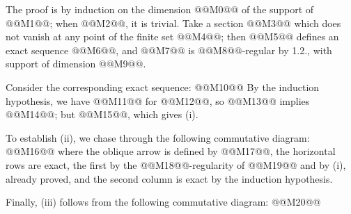 The proof is by induction on the dimension @@M0@@ of the support of @@M1@@; when @@M2@@, it is trivial. Take a section @@M3@@ which does not vanish at any point of the finite set @@M4@@; then @@M5@@ defines an exact sequence @@M6@@, and @@M7@@ is @@M8@@-regular by 1.2., with support of dimension @@M9@@.

Consider the corresponding exact sequence:
@@M10@@
By the induction hypothesis, we have @@M11@@ for @@M12@@, so @@M13@@ implies @@M14@@; but @@M15@@, which gives (i).

To establish (ii), we chase through the following commutative diagram:
@@M16@@
where the oblique arrow is defined by @@M17@@, the horizontal rows are exact, the first by the @@M18@@-regularity of @@M19@@ and by (i), already proved, and the second column is exact by the induction hypothesis.

Finally, (iii) follows from the following commutative diagram:
@@M20@@

